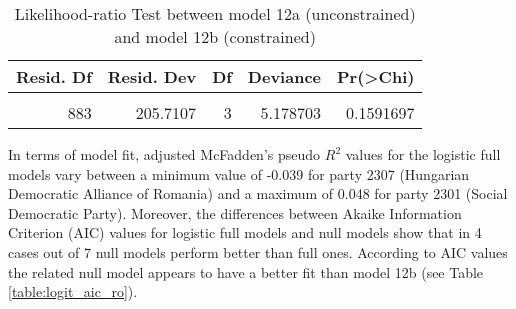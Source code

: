 \documentclass[
]{article}
\begin{document}
\begin{table}[!h]

\caption{\label{tab:unnamed-chunk-150}Likelihood-ratio Test between model 12a (unconstrained) and model 12b (constrained)
                  \label{table:lrtest_1_ro}}
\centering
\begin{tabular}[t]{r|r|r|r|r}
\hline
Resid. Df & Resid. Dev & Df & Deviance & Pr(>Chi)\\
\hline
\cellcolor{gray!6}{886} & \cellcolor{gray!6}{210.8894} & \cellcolor{gray!6}{} & \cellcolor{gray!6}{} & \cellcolor{gray!6}{}\\
\hline
883 & 205.7107 & 3 & 5.178703 & 0.1591697\\
\hline
\end{tabular}
\end{table}

In terms of model fit, adjusted McFadden's pseudo \(R^2\) values for the logistic full models vary between
a minimum value of
-0.039
for party 2307
(Hungarian Democratic Alliance of Romania)
and a maximum of
0.048
for party 2301
(Social Democratic Party).
Moreover, the differences between Akaike Information Criterion (AIC) values for logistic full models and
null models show that in 4 cases out of 7 null models perform better than full ones. According to AIC
values the related null model appears to have a better fit than model 12b (see Table
\ref{table:logit_aic_ro}).
\end{document}
